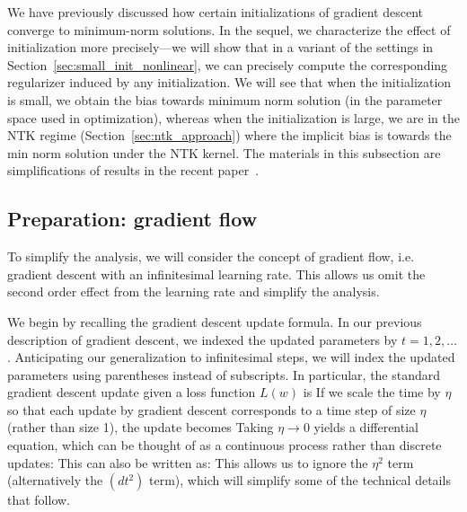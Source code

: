 

We have previously discussed how certain initializations of gradient descent converge to minimum-norm solutions. In the sequel, we characterize the effect of initialization more precisely---we will show that in a variant of the settings in Section~\ref{sec:small_init_nonlinear}, we can precisely compute the corresponding regularizer induced by any initialization. We will see that when the initialization is small, we obtain the bias towards minimum norm solution (in the parameter space used in optimization), whereas when the initialization is large, we are in the NTK regime (Section~\ref{sec:ntk_approach}) where the implicit bias is towards the min norm solution under the NTK kernel. The materials in this subsection are simplifications of results in the recent paper~\citet{woodworth2020kernel}.

\subsection{Preparation: gradient flow}
To simplify the analysis, we will consider the concept of gradient flow, i.e. gradient descent with an infinitesimal learning rate.  This allows us omit the second order effect from the learning rate and simplify the analysis. 

We begin by recalling the gradient descent update formula. In our previous description of gradient descent, we indexed the updated parameters by $t = 1,2,\dots$. Anticipating our generalization to infinitesimal steps, we will index the updated parameters using parentheses instead of subscripts. In particular, the standard gradient descent update given a loss function $L(w)$ is
If we scale the time by $\eta$ so that each update by gradient descent corresponds to a time step of size $\eta$ (rather than size 1), the update becomes
Taking $\eta \to 0$ yields a differential equation, which can be thought of as a continuous process rather than discrete updates:
This can also be written as:
This allows us to ignore the $\eta^2$ term (alternatively the $(dt^2)$ term), which will simplify some of the technical details that follow.

